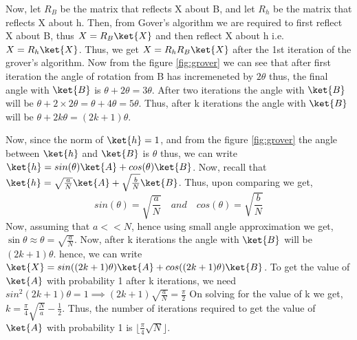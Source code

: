 \documentclass[12pt, oneside]{book}
\theoremstyle{definition}
\theoremstyle{definition}
\theoremstyle{remark}
\begin{document}
Now, let $R_B$ be the matrix that reflects X about B, and let $R_h$ be the matrix that reflects X about h.
Then, from Gover's algorithm we are required to first reflect X about B, thus $X=R_B\ket{X}$ and then reflect X about h i.e. 
$X=R_h\ket{X}$. Thus, we get $X=R_hR_B\ket{X}$ after the 1st iteration of the grover's algorithm. Now from the figure \ref{fig:grover}
we can see that after first iteration the angle of rotation from B has incremeneted by $2\theta$ thus, the final angle with $\ket{B}$ is $\theta+2\theta=3\theta$. 
After two iterations the angle with $\ket{B}$ will be $\theta + 2\times 2\theta=\theta + 4\theta=5\theta$.
Thus, after k iterations the angle with $\ket{B}$ will be $\theta + 2k\theta=(2k+1)\theta$. 

Now, since the norm of $\ket{h}=1$, and from the figure \ref{fig:grover} the angle between $\ket{h}$ and $\ket{B}$ is $\theta$ thus, 
we can write $\ket{h}=sin(\theta)\ket{A}+cos(\theta)\ket{B}$.  Now, recall that $\ket{h}=\sqrt{\frac{a}{N}}\ket{A}+\sqrt{\frac{b}{N}}\ket{B}$. Thus, upon comparing we get,
\[
    sin(\theta)=\sqrt{\frac{a}{N}} \quad and \quad cos(\theta)=\sqrt{\frac{b}{N}}
\]
Now, assuming that $a<<N$, hence using small angle approximation we get, $\sin \theta \approx \theta = \sqrt{\frac{a}{N}}$.
Now, after k iterations the angle with $\ket{B}$ will be $(2k+1)\theta$. hence, we can write $\ket{X}=sin((2k+1)\theta)\ket{A}+cos((2k+1)\theta)\ket{B}$.
To get the value of $\ket{A}$ with probability 1 after k iterations, we need $sin^2(2k+1)\theta=1 \implies (2k+1)\sqrt{\frac{a}{N}}=\frac{\pi}{2}$
On solving for the value of k we get, $k=\frac{\pi}{4}\sqrt{\frac{N}{a}}-\frac{1}{2}$. Thus, the number of iterations required to get the value of $\ket{A}$ with probability 1 is $\lfloor \frac{\pi}{4}\sqrt{N}\rfloor$.
\end{document}
